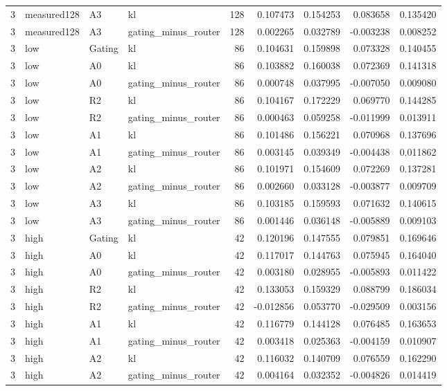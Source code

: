 \begin{tabular}{rlllrrrrr}
3 & measured128 & A3 & kl & 128 & 0.107473 & 0.154253 & 0.083658 & 0.135420 \\
3 & measured128 & A3 & gating_minus_router & 128 & 0.002265 & 0.032789 & -0.003238 & 0.008252 \\
3 & low & Gating & kl & 86 & 0.104631 & 0.159898 & 0.073328 & 0.140455 \\
3 & low & A0 & kl & 86 & 0.103882 & 0.160038 & 0.072369 & 0.141318 \\
3 & low & A0 & gating_minus_router & 86 & 0.000748 & 0.037995 & -0.007050 & 0.009080 \\
3 & low & R2 & kl & 86 & 0.104167 & 0.172229 & 0.069770 & 0.144285 \\
3 & low & R2 & gating_minus_router & 86 & 0.000463 & 0.059258 & -0.011999 & 0.013911 \\
3 & low & A1 & kl & 86 & 0.101486 & 0.156221 & 0.070968 & 0.137696 \\
3 & low & A1 & gating_minus_router & 86 & 0.003145 & 0.039349 & -0.004438 & 0.011862 \\
3 & low & A2 & kl & 86 & 0.101971 & 0.154609 & 0.072269 & 0.137281 \\
3 & low & A2 & gating_minus_router & 86 & 0.002660 & 0.033128 & -0.003877 & 0.009709 \\
3 & low & A3 & kl & 86 & 0.103185 & 0.159593 & 0.071632 & 0.140615 \\
3 & low & A3 & gating_minus_router & 86 & 0.001446 & 0.036148 & -0.005889 & 0.009103 \\
3 & high & Gating & kl & 42 & 0.120196 & 0.147555 & 0.079851 & 0.169646 \\
3 & high & A0 & kl & 42 & 0.117017 & 0.144763 & 0.075945 & 0.164040 \\
3 & high & A0 & gating_minus_router & 42 & 0.003180 & 0.028955 & -0.005893 & 0.011422 \\
3 & high & R2 & kl & 42 & 0.133053 & 0.159329 & 0.088799 & 0.186034 \\
3 & high & R2 & gating_minus_router & 42 & -0.012856 & 0.053770 & -0.029509 & 0.003156 \\
3 & high & A1 & kl & 42 & 0.116779 & 0.144128 & 0.076485 & 0.163653 \\
3 & high & A1 & gating_minus_router & 42 & 0.003418 & 0.025363 & -0.004159 & 0.010907 \\
3 & high & A2 & kl & 42 & 0.116032 & 0.140709 & 0.076559 & 0.162290 \\
3 & high & A2 & gating_minus_router & 42 & 0.004164 & 0.032352 & -0.004826 & 0.014419 \\

\end{tabular}
